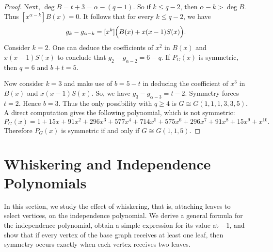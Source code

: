 \documentclass[12pt]{amsart}
\theoremstyle{plain}
\theoremstyle{definition}
\begin{document}
\begin{proof}
Next, $\deg B=t+3=\alpha-(q-1)$.
So if \(k\le q-2\), then \(\alpha-k>\deg B\). Thus $[x^{\alpha-k}]B(x)=0$.
It follows that for every \(k\le q-2\), we have
\[
g_k-g_{\alpha-k}
=
[x^k]\Bigl(B(x)+x(x-1)S(x)\Bigr).
\]
Consider \(k=2\). One can deduce the coefficients of $x^2$ in $B(x)$ and $x(x-1)S(x)$ to conclude that $g_2-g_{\alpha-2}=6-q$.
If \(P_G(x)\) is symmetric, then $q=6$ and $b+t=5$.

Now consider \(k=3\) and make use of \(b=5-t\) in deducing the coefficient of $x^3$ in  $B(x)$ and $x(x-1)S(x)$. So, we have $g_3-g_{\alpha-3}=t-2$.
Symmetry forces \(t=2\). Hence \(b=3\). Thus the only  possibility with \(q\ge 4\) is $G\cong G(1,1,1,3,3,5)$.
A direct computation gives the following polynomial, which is not symmetric:
\[
P_G(x)
=
1+15x+91x^2+296x^3+577x^4+714x^5+575x^6+296x^7+91x^8+15x^9+x^{10}.
\]
Therefore \(P_G(x)\) is symmetric if and only if \(G\cong G(1,1,5)\).
\end{proof}


\section{Whiskering and Independence Polynomials}\label{sec:whisker}


In this section, we study the effect of whiskering, that is, attaching leaves to select vertices, on the independence polynomial. We derive a general formula for the independence polynomial, obtain a simple expression for its value at \(-1\), and show that if every vertex of the base graph receives at least one leaf, then symmetry occurs exactly when each vertex receives two leaves.
\end{document}
